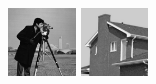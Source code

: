 \begin{figure}[h!]
    \centering
    \newcommand\size{0.16\textwidth}
    \newcommand\gap{0.007\textwidth}
    \includegraphics[width=\size]{fig/testimages/cameraman.png}\hfill
    \includegraphics[width=\size]{fig/testimages/house.png}\hfill

\end{figure}
